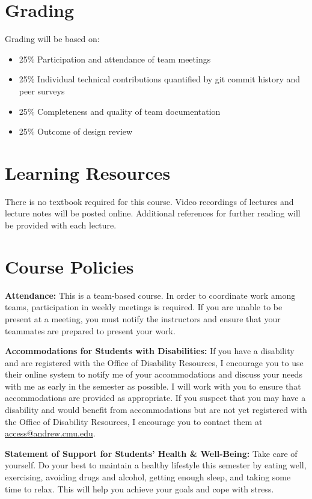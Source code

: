 \documentclass[11pt,letterpaper]{article}
\begin{document}
\section*{Grading}

Grading will be based on:
\begin{itemize}
	\item 25\% Participation and attendance of team meetings
	\item 25\% Individual technical contributions quantified by git commit history and peer surveys
	\item 25\% Completeness and quality of team documentation
	\item 25\% Outcome of design review
\end{itemize}


\section*{Learning Resources}

There is no textbook required for this course. Video recordings of lectures and lecture notes will be posted online. Additional references for further reading will be provided with each lecture.

\section*{Course Policies}

\textbf{Attendance:} This is a team-based course. In order to coordinate work among teams, participation in weekly meetings is required. If you are unable to be present at a meeting, you must notify the instructors and ensure that your teammates are prepared to present your work.

\medskip
\noindent
\textbf{Accommodations for Students with Disabilities:} If you have a disability and are registered with the Office of Disability Resources, I encourage you to use their online system to notify me of your accommodations and discuss your needs with me as early in the semester as possible. I will work with you to ensure that accommodations are provided as appropriate. If you suspect that you may have a disability and would benefit from accommodations but are not yet registered with the Office of Disability Resources, I encourage you to contact them at \href{mailto:access@andrew.cmu.edu}{access@andrew.cmu.edu}.

\medskip
\noindent
\textbf{Statement of Support for Students' Health \& Well-Being:} Take care of yourself. Do your best to maintain a healthy lifestyle this semester by eating well, exercising, avoiding drugs and alcohol, getting enough sleep, and taking some time to relax. This will help you achieve your goals and cope with stress.
\end{document}
